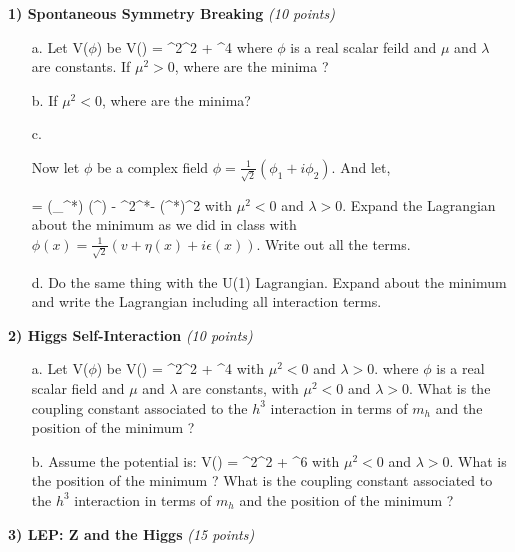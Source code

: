 {\large

\textbf{1) Spontaneous Symmetry Breaking } \hfill \textit{(10 points)}\\

\begin{itemize}
\item[a.]{ Let V($\phi$) be 
\be
V(\phi) = \mu^2\phi^2 + \lambda \phi^4
\ee
where $\phi$ is a real scalar feild and $\mu$ and $\lambda$ are constants. 
If $\mu^2 > 0$, where are the minima ?
}
\item[b.]{ If $\mu^2 < 0$, where are the minima?}
\item[c.]{ 
Now let $\phi$ be a complex field $\phi = \frac{1}{\sqrt{2}}(\phi_1 + i \phi_2)$.
And let,

\be
{} = (\partial_\mu \phi^*) (\partial^\mu \phi) - \mu^2\phi^*\phi - \lambda (\phi^*\phi)^2
\ee
with $\mu^2 < 0$ and $\lambda > 0$.
Expand the Lagrangian about the minimum as we did in class with $\phi(x) = \frac{1}{\sqrt{2}}(v+\eta(x)+i\epsilon(x))$. Write out all the terms. 
}
\item[d.]{ Do the same thing with the U(1) Lagrangian.  Expand about the minimum and write the Lagrangian including all interaction terms.}
\end{itemize}

\vspace*{0.25in}


\textbf{2) Higgs Self-Interaction } \hfill \textit{(10 points)}\\

\begin{itemize}
\item[a.]{ Let V($\phi$) be
\be
V(\phi) = \mu^2\phi^2 + \lambda \phi^4
\ee
with $\mu^2 < 0$ and $\lambda > 0$.
where $\phi$ is a real scalar field and $\mu$ and $\lambda$ are constants, with $\mu^2 < 0$ and $\lambda > 0$.
What is the coupling constant associated to the $h^3$ interaction in terms of $m_h$ and the position of the minimum ?
}
\item[b.]{ 
Assume the potential is: 
\be
V(\phi) = \mu^2\phi^2 + \lambda \phi^6
\ee
with $\mu^2 < 0$ and $\lambda > 0$.
What is the position of the minimum ?
What is the coupling constant associated to the $h^3$ interaction in terms of $m_h$ and the position of the minimum ?
}
\end{itemize}

\clearpage


\textbf{3) LEP: Z and the Higgs } \hfill \textit{(15 points)}\\

}
